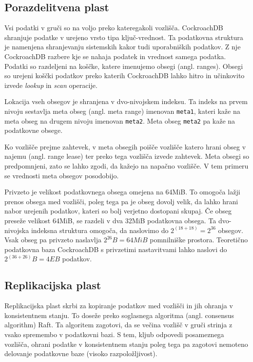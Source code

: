 \documentclass[a4paper, 12pt]{book}
\begin{document}
 
\subsection{Porazdelitvena plast}

Vsi podatki v gruči so na voljo preko kateregakoli vozlišča. CockroachDB shranjuje podatke v urejeno vrsto tipa ključ-vrednost. Ta podatkovna stru\-ktu\-ra je namenjena shranjevanju sistemskih kakor tudi uporabniških podatkov. Z nje CockroachDB razbere kje se nahaja podatek in vrednost samega podatka. Podatki so razdeljeni na koščke, katere imenujemo obsegi (angl. ranges). Obsegi so urejeni koščki podatkov preko katerih CockroachDB lahko hitro in učinkovito izvede \textit{lookup} in \textit{scan} operacije.

Lokacija vseh obsegov je shranjena v dvo-nivojskem indeksu. Ta indeks na prvem nivoju sestavlja meta obseg (angl. meta range) imenovan \texttt{meta1}, kateri kaže na meta obseg na drugem nivoju imenovan \texttt{meta2}. Meta obseg \texttt{meta2} pa kaže na podatkovne obsege.

Ko vozlišče prejme zahtevek, v meta obsegih poišče vozlišče katero hrani obseg v najemu (angl. range lease) ter preko tega vozlišča izvede zahtevek. Meta obsegi so predpomnjeni, zato se lahko zgodi, da kažejo na napačno vozlišče. V tem primeru se vrednosti meta obsegov posodobijo.

Privzeto je velikost podatkovnega obsega omejena na 64MiB. To omogoča lažji prenos obsega med vozlišči, poleg tega pa je obseg dovolj velik, da lahko hrani nabor urejenih podatkov, kateri so bolj verjetno dostopani skupaj. Če obseg preseže velikost 64MiB, se razdeli v dva 32MiB podatkovna obsega. Ta dvo-nivojska indeksna struktura omogoča, da naslovimo do \(2^{(18 + 18)} = 2^{36}\) obsegov. Vsak obseg pa privzeto naslavlja \(2^{26}B = 64MiB\) pomnilniške prostora. Teoretično podatkovna baza CockroachDB s privzetimi nastavitvami lahko naslovi do \(2^{(36+26)}B = 4EB\) podatkov. 

\subsection{Replikacijska plast}

Replikacijska plast skrbi za kopiranje podatkov med vozlišči in jih ohranja v konsistentnem stanju. To doseže preko soglasnega algoritma (angl. consensus algorithm) Raft. Ta algoritem zagotovi, da se večina vozlišč v gruči strinja z vsako spremembo v podatkovni bazi. S tem, kljub odpovedi posameznega vozlišča, ohrani podatke v konsistentnem stanju poleg tega pa zagotovi nemoteno delovanje podatkovne baze (visoko razpoložljivost).
\end{document}
